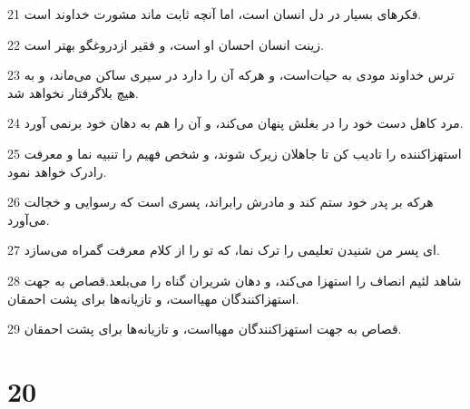 \par 21 فکرهای بسیار در دل انسان است، اما آنچه ثابت ماند مشورت خداوند است.
\par 22 زینت انسان احسان او است، و فقیر ازدروغگو بهتر است.
\par 23 ترس خداوند مودی به حیات‌است، و هرکه آن را دارد در سیری ساکن می‌ماند، و به هیچ بلاگرفتار نخواهد شد.
\par 24 مرد کاهل دست خود را در بغلش پنهان می‌کند، و آن را هم به دهان خود برنمی آورد.
\par 25 استهزاکننده را تادیب کن تا جاهلان زیرک شوند، و شخص فهیم را تنبیه نما و معرفت رادرک خواهد نمود.
\par 26 هر‌که بر پدر خود ستم کند و مادرش رابراند، پسری است که رسوایی و خجالت می‌آورد.
\par 27 ‌ای پسر من شنیدن تعلیمی را ترک نما، که تو را از کلام معرفت گمراه می‌سازد.
\par 28 شاهد لئیم انصاف را استهزا می‌کند، و دهان شریران گناه را می‌بلعد.قصاص به جهت استهزاکنندگان مهیااست، و تازیانه‌ها برای پشت احمقان.
\par 29 قصاص به جهت استهزاکنندگان مهیااست، و تازیانه‌ها برای پشت احمقان.
 
\chapter{20}

